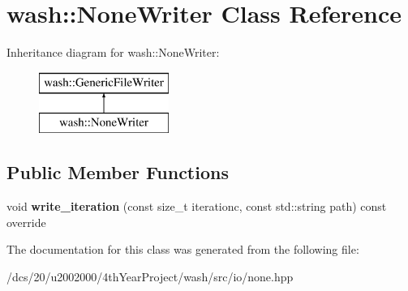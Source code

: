 \hypertarget{classwash_1_1NoneWriter}{}\section{wash\+:\+:None\+Writer Class Reference}
\label{classwash_1_1NoneWriter}
Inheritance diagram for wash\+:\+:None\+Writer\+:\begin{figure}[H]
\begin{center}
\leavevmode
\includegraphics[height=2.000000cm]{classwash_1_1NoneWriter}
\end{center}
\end{figure}
\subsection*{Public Member Functions}
\begin{DoxyCompactItemize}
\item 
\mbox{\label{classwash_1_1NoneWriter_a0c7980e62b349a3d883a75a673d687ca}} 
void {\bfseries write\+\_\+iteration} (const size\+\_\+t iterationc, const std\+::string path) const override
\end{DoxyCompactItemize}


The documentation for this class was generated from the following file\+:\begin{DoxyCompactItemize}
\item 
/dcs/20/u2002000/4th\+Year\+Project/wash/src/io/none.\+hpp\end{DoxyCompactItemize}
